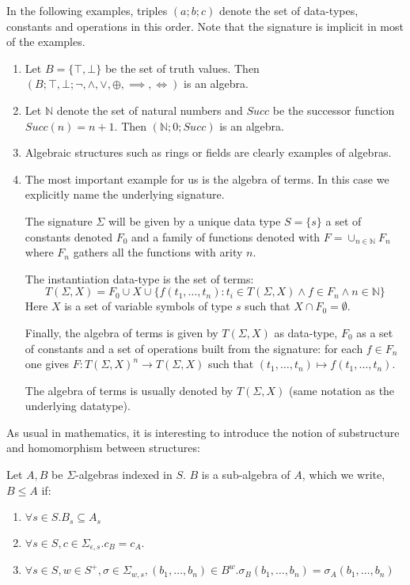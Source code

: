 \begin{example}
In the following examples, triples $(a;b;c)$ denote the set of data-types, constants and operations in this order. Note that the signature is implicit in most of the examples. 

\begin{enumerate}
\item Let $B = \{ \top,\bot \}$ be the set of truth values. Then $(B;\top,\bot; \lnot , \land , \lor , \oplus , \implies , \iff )$ is an algebra.

\item Let $\mathbb{N}$ denote the set of natural numbers and $Succ$ be the successor function $Succ(n) = n+1$. Then $(\mathbb{N};0;Succ)$ is an algebra.

\item Algebraic structures such as rings or fields are clearly examples of algebras.

\item The most important example for us is the algebra of terms. In this case we explicitly name the underlying signature. 

The signature $\Sigma$ will be given by a unique  data type $S = \{s\}$ a set of constants denoted $F_0$ and a family of functions denoted with $F = \cup_{n \in \mathbb{N}} F_n$ where $F_n$ gathers all the functions with arity $n$. 

The instantiation data-type is the set of terms: $$T(\Sigma, X) = F_0 \cup X \cup \{f(t_1,\ldots,t_n):t_i \in T(\Sigma,X) \land f \in F_n \land n \in \mathbb{N} \}$$ Here $X$ is a set of variable symbols of type $s$ such that $X \cap F_0 = \emptyset$. 

Finally, the algebra of terms is given by $T(\Sigma,X)$ as data-type, $F_0$ as a set of constants and a set of operations built from the signature: for each $f \in F_n$ one gives $F:T(\Sigma,X)^n \to T(\Sigma,X)$ such that $(t_1,\ldots,t_n) \mapsto f(t_1,\ldots,t_n)$.

The algebra of terms is usually denoted by $T(\Sigma,X)$ (same notation as the underlying datatype).
\end{enumerate}
\end{example}

As usual in mathematics, it is interesting to introduce the notion of substructure and homomorphism between structures:

\begin{definition}
Let $A,B$ be $\Sigma$-algebras indexed in $S$. $B$ is a sub-algebra of $A$, which we write, $B \le A$ if:

\begin{enumerate}
\item $\forall s \in S.B_s \subseteq A_s$
\item $\forall s \in S,c \in \Sigma_{\epsilon,s}.c_B = c_A$. 
\item $\forall s \in S,w \in S^{+},\sigma \in \Sigma_{w,s},(b_1,\ldots,b_n) \in B^{w}.\sigma_B(b_1,\ldots,b_n) = \sigma_A(b_1,\ldots,b_n)$
\end{enumerate}
\end{definition}


